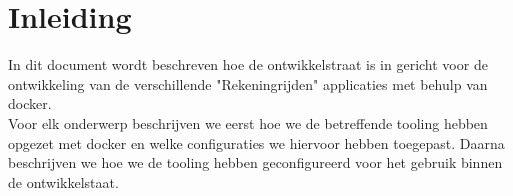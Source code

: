 \chapter{Inleiding}
In dit document wordt beschreven hoe de ontwikkelstraat is in gericht voor de ontwikkeling van de verschillende "Rekeningrijden" applicaties met behulp van docker.
\\
Voor elk onderwerp beschrijven we eerst hoe we de betreffende tooling hebben opgezet met docker en welke configuraties we hiervoor hebben toegepast. Daarna beschrijven we hoe we de tooling hebben geconfigureerd voor het gebruik binnen de ontwikkelstaat.